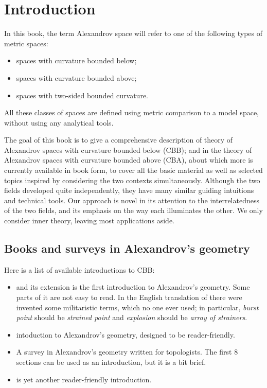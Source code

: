 \chapter{Introduction}

In this book, the term Alexandrov space will refer to one of the following types of %
metric spaces:
\begin{itemize}
\item spaces with curvature bounded below;
\item spaces with curvature bounded above;
\item spaces with two-sided bounded curvature.
\end{itemize}
All these classes of spaces are defined using metric comparison to a model space, without using any analytical tools. 

The goal of this book is to give a comprehensive description of theory of Alexandrov spaces with curvature bounded below (CBB);  and in the theory of Alexandrov spaces with curvature bounded above (CBA), about which more is currently available in book form, to cover all the basic material as well as selected topics inspired by considering the two contexts simultaneously.  Although the two fields developed quite independently, they have many similar guiding intuitions and technical tools.  Our approach is novel in its attention to the interrelatedness of the two fields, and its emphasis on the way each illuminates the other.  We only consider inner theory, leaving most applications aside.


\section{Books and surveys in Alexandrov's geometry}
Here is a list of available introductions to CBB: 
\begin{itemize}
\item \cite{BGP} and its extension \cite{perelman:spaces2} is the first introduction to Alexandrov's geometry. 
Some parts of it are not easy to read. 
In the English translation of \cite{BGP} there were invented some militaristic terms, which no one ever used;  in particular, \emph{burst point} should be \emph{strained point} and \emph{explosion} should be \emph{array of strainers}.
\item \cite{shiohama} intoduction to Alexandrov's geometry, designed to be reader-friendly. 
\item \cite{plaut:survey} A survey in Alexandrov's geometry 
written for topologists. 
The first 8 sections can be used as an introduction, but it is  a bit brief.
\item \cite[Chapter 10]{BBI} is yet another reader-friendly introduction.
\end{itemize}

